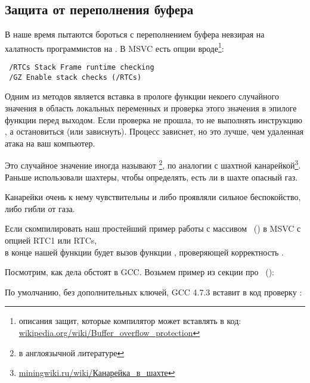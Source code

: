 \subsection{Защита от переполнения буфера}
\label{subsec:BO_protection}

В наше время пытаются бороться с переполнением буфера невзирая на халатность программистов на \CCpp. 
В MSVC есть опции вроде\footnote{описания защит, которые компилятор может вставлять в код:
\href{http://go.yurichev.com/17133}{wikipedia.org/wiki/Buffer\_overflow\_protection}}:

\begin{lstlisting}
 /RTCs Stack Frame runtime checking
 /GZ Enable stack checks (/RTCs)
\end{lstlisting}

Одним из методов является вставка в прологе функции некоего случайного значения в область локальных переменных 
и проверка этого значения в эпилоге функции перед выходом. 
Если проверка не прошла, то не выполнять инструкцию \RET, а остановиться (или зависнуть). 
Процесс зависнет, но это лучше, чем удаленная атака на ваш компьютер.

\newcommand{\CANARYURL}{\href{http://go.yurichev.com/17135}{miningwiki.ru/wiki/Канарейка\_в\_шахте}}

Это случайное значение иногда называют 
\footnote{ в англоязычной литературе}, 
по аналогии с шахтной канарейкой\footnote{\CANARYURL}.
Раньше использовали шахтеры, чтобы определять, есть ли в шахте опасный газ.

Канарейки очень к нему чувствительны и либо проявляли сильное беспокойство, либо гибли от газа.

Если скомпилировать наш простейший пример работы с массивом ~() в \ac{MSVC}
с опцией RTC1 или RTCs, \\
в конце нашей функции будет вызов функции , проверяющей корректность .

Посмотрим, как дела обстоят в GCC. 
Возьмем пример из секции про ~():



По умолчанию, без дополнительных ключей, GCC 4.7.3 вставит в код проверку :



